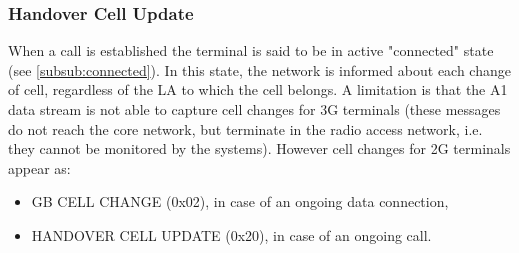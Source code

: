 \documentclass[master,english]{hgbthesis}
\begin{document}
\subsubsection{Handover Cell Update}
When a call is established the terminal is said to be in active "connected" state (see \ref{subsub:connected}).  In this state, the network is informed about each change of
cell, regardless of the LA to which the cell belongs. A limitation is that the A1 data stream is not able to capture cell changes for 3G terminals (these messages do not reach the core network, but terminate in the radio access network,
i.e. they cannot be monitored by the systems).
However cell changes for 2G terminals appear as:
\begin{itemize}
	\item GB CELL CHANGE (0x02), in case of an ongoing data connection,
	\item HANDOVER CELL UPDATE (0x20), in case of an ongoing call.
\end{itemize}
\end{document}
